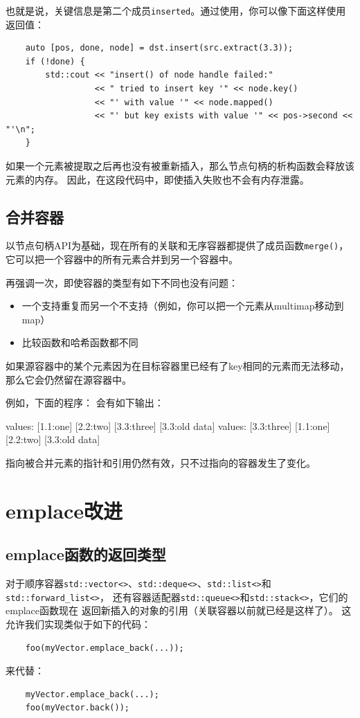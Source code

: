 也就是说，关键信息是第二个成员\texttt{inserted}。通过使用，你可以像下面这样使用返回值：
\begin{lstlisting}
    auto [pos, done, node] = dst.insert(src.extract(3.3));
    if (!done) {
        std::cout << "insert() of node handle failed:"
                  << " tried to insert key '" << node.key()
                  << "' with value '" << node.mapped()
                  << "' but key exists with value '" << pos->second << "'\n";
    }
\end{lstlisting}
如果一个元素被提取之后再也没有被重新插入，那么节点句柄的析构函数会释放该元素的内存。
因此，在这段代码中，即使插入失败也不会有内存泄露。

\subsection{合并容器}
以节点句柄API为基础，现在所有的关联和无序容器都提供了成员函数\texttt{merge()}，
它可以把一个容器中的所有元素合并到另一个容器中。

再强调一次，即使容器的类型有如下不同也没有问题：
\begin{itemize}
    \item 一个支持重复而另一个不支持（例如，你可以把一个元素从multimap移动到map）
    \item 比较函数和哈希函数都不同
\end{itemize}
如果源容器中的某个元素因为在目标容器里已经有了key相同的元素而无法移动，
那么它会仍然留在源容器中。

例如，下面的程序：
会有如下输出：
\begin{blacklisting}
    values:
      [1.1:one]  [2.2:two]  [3.3:three]
      [3.3:old data]
    values:
      [3.3:three]
      [1.1:one]  [2.2:two]  [3.3:old data]
\end{blacklisting}
指向被合并元素的指针和引用仍然有效，只不过指向的容器发生了变化。


\section{emplace改进}

\subsection{emplace函数的返回类型}
对于顺序容器\texttt{std::vector<>}、\texttt{std::deque<>}、\texttt{std::list<>}和\texttt{std::forward\_list<>}，
还有容器适配器\texttt{std::queue<>}和\texttt{std::stack<>}，它们的emplace函数现在
返回新插入的对象的引用（关联容器以前就已经是这样了）。
这允许我们实现类似于如下的代码：
\begin{lstlisting}
    foo(myVector.emplace_back(...));
\end{lstlisting}
来代替：
\begin{lstlisting}
    myVector.emplace_back(...);
    foo(myVector.back());
\end{lstlisting}

